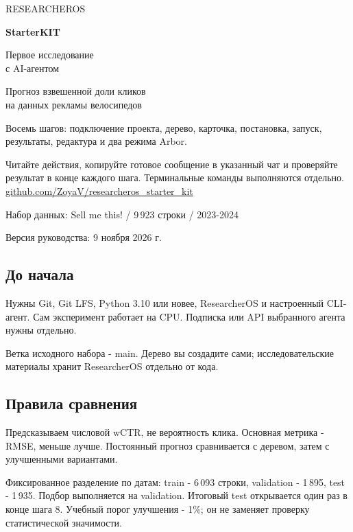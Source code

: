 \documentclass[10pt,a4paper]{article}
\begin{document}
\begin{titlepage}
\vspace*{12mm}
{\color{accent}\large RESEARCHEROS}\par
\vspace{14mm}
{\fontsize{38}{44}\selectfont\bfseries StarterKIT}\par
\vspace{7mm}
{\Large Первое исследование\\с AI-агентом}\par
\vspace{12mm}
{\large Прогноз взвешенной доли кликов\\на данных рекламы велосипедов}\par
\vspace{12mm}
\begin{promptbox}
Восемь шагов: подключение проекта, дерево, карточка, постановка,
запуск, результаты, редактура и два режима Arbor.
\end{promptbox}
\vspace{7mm}
Читайте действия, копируйте готовое сообщение в указанный чат и проверяйте результат в конце каждого шага. Терминальные команды выполняются отдельно.
\vfill
\href{https://github.com/ZoyaV/researcheros_starter_kit}{github.com/ZoyaV/researcheros\_starter\_kit}\par
\small Набор данных: Sell me this! / 9\,923 строки / 2023-2024\par
Версия руководства: 9 ноября 2026 г.
\end{titlepage}
\tableofcontents
\vspace{10mm}
\subsection*{До начала}
Нужны Git, Git LFS, Python 3.10 или новее, ResearcherOS и настроенный CLI-агент. Сам эксперимент работает на CPU. Подписка или API выбранного агента нужны отдельно.

Ветка исходного набора - main. Дерево вы создадите сами; исследовательские материалы хранит ResearcherOS отдельно от кода.
\subsection*{Правила сравнения}
Предсказываем числовой wCTR, не вероятность клика. Основная метрика - RMSE, меньше лучше. Постоянный прогноз сравнивается с деревом, затем с улучшенными вариантами.

Фиксированное разделение по датам: train - 6\,093 строки, validation - 1\,895, test - 1\,935. Подбор выполняется на validation. Итоговый test открывается один раз в конце шага 8. Учебный порог улучшения - 1\%; он не заменяет проверку статистической значимости.
\end{document}
